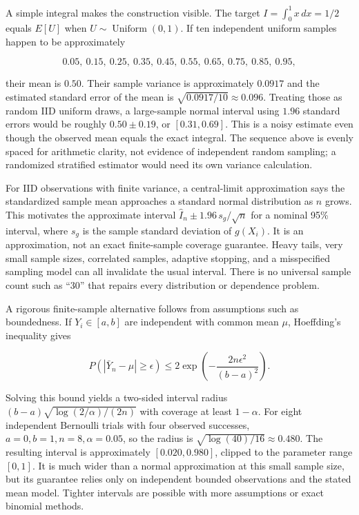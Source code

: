 A simple integral makes the construction visible. The target \(I=\int_0^1 x\,dx=1/2\) equals \(E[U]\) when \(U\sim\operatorname{Uniform}(0,1)\). If ten independent uniform samples happen to be approximately

\[
0.05,\ 0.15,\ 0.25,\ 0.35,\ 0.45,\ 0.55,\ 0.65,\ 0.75,\ 0.85,\ 0.95,
\]

their mean is \(0.50\). Their sample variance is approximately \(0.0917\) and the estimated standard error of the mean is \(\sqrt{0.0917/10}\approx0.096\). Treating those as random IID uniform draws, a large-sample normal interval using \(1.96\) standard errors would be roughly \(0.50\pm0.19\), or \([0.31,0.69]\). This is a noisy estimate even though the observed mean equals the exact integral. The sequence above is evenly spaced for arithmetic clarity, not evidence of independent random sampling; a randomized stratified estimator would need its own variance calculation.

For IID observations with finite variance, a central-limit approximation says the standardized sample mean approaches a standard normal distribution as \(n\) grows. This motivates the approximate interval \(\hat I_n\pm1.96\,s_g/\sqrt n\) for a nominal 95\% interval, where \(s_g\) is the sample standard deviation of \(g(X_i)\). It is an approximation, not an exact finite-sample coverage guarantee. Heavy tails, very small sample sizes, correlated samples, adaptive stopping, and a misspecified sampling model can all invalidate the usual interval. There is no universal sample count such as ``30'' that repairs every distribution or dependence problem.

A rigorous finite-sample alternative follows from assumptions such as boundedness. If \(Y_i\in[a,b]\) are independent with common mean \(\mu\), Hoeffding's inequality gives

\[
P(|\bar Y_n-\mu|\ge\epsilon)\le2\exp\left(-\frac{2n\epsilon^2}{(b-a)^2}\right).
\]

Solving this bound yields a two-sided interval radius \((b-a)\sqrt{\log(2/\alpha)/(2n)}\) with coverage at least \(1-\alpha\). For eight independent Bernoulli trials with four observed successes, \(a=0,b=1,n=8,\alpha=0.05\), so the radius is \(\sqrt{\log(40)/16}\approx0.480\). The resulting interval is approximately \([0.020,0.980]\), clipped to the parameter range \([0,1]\). It is much wider than a normal approximation at this small sample size, but its guarantee relies only on independent bounded observations and the stated mean model. Tighter intervals are possible with more assumptions or exact binomial methods.

